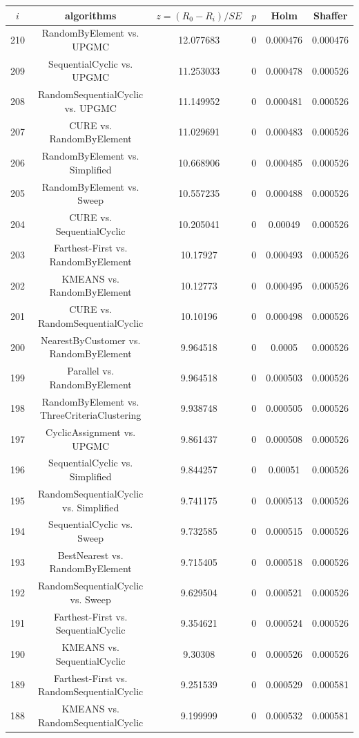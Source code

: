 \documentclass[a4paper,10pt]{article}
\begin{document}
\begin{landscape}
\begin{table}[!htp]
\centering\scriptsize
\begin{tabular}{cccccc}
$i$&algorithms&$z=(R_0 - R_i)/SE$&$p$&Holm&Shaffer\\
\hline210&RandomByElement vs. UPGMC&12.077683&0&0.000476&0.000476\\
209&SequentialCyclic vs. UPGMC&11.253033&0&0.000478&0.000526\\
208&RandomSequentialCyclic vs. UPGMC&11.149952&0&0.000481&0.000526\\
207&CURE vs. RandomByElement&11.029691&0&0.000483&0.000526\\
206&RandomByElement vs. Simplified&10.668906&0&0.000485&0.000526\\
205&RandomByElement vs. Sweep&10.557235&0&0.000488&0.000526\\
204&CURE vs. SequentialCyclic&10.205041&0&0.00049&0.000526\\
203&Farthest-First vs. RandomByElement&10.17927&0&0.000493&0.000526\\
202&KMEANS vs. RandomByElement&10.12773&0&0.000495&0.000526\\
201&CURE vs. RandomSequentialCyclic&10.10196&0&0.000498&0.000526\\
200&NearestByCustomer vs. RandomByElement&9.964518&0&0.0005&0.000526\\
199&Parallel vs. RandomByElement&9.964518&0&0.000503&0.000526\\
198&RandomByElement vs. ThreeCriteriaClustering&9.938748&0&0.000505&0.000526\\
197&CyclicAssignment vs. UPGMC&9.861437&0&0.000508&0.000526\\
196&SequentialCyclic vs. Simplified&9.844257&0&0.00051&0.000526\\
195&RandomSequentialCyclic vs. Simplified&9.741175&0&0.000513&0.000526\\
194&SequentialCyclic vs. Sweep&9.732585&0&0.000515&0.000526\\
193&BestNearest vs. RandomByElement&9.715405&0&0.000518&0.000526\\
192&RandomSequentialCyclic vs. Sweep&9.629504&0&0.000521&0.000526\\
191&Farthest-First vs. SequentialCyclic&9.354621&0&0.000524&0.000526\\
190&KMEANS vs. SequentialCyclic&9.30308&0&0.000526&0.000526\\
189&Farthest-First vs. RandomSequentialCyclic&9.251539&0&0.000529&0.000581\\
188&KMEANS vs. RandomSequentialCyclic&9.199999&0&0.000532&0.000581\\

\end{tabular}
\end{table}
\end{landscape}
\end{document}
